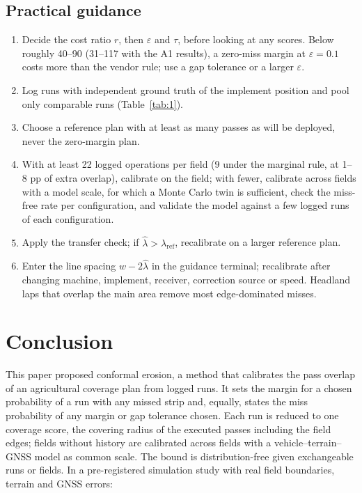 \documentclass[preprint,12pt,authoryear]{elsarticle}
\providecommand{\tightlist}{\setlength{\itemsep}{0pt}\setlength{\parskip}{0pt}}
\begin{document}
\subsection{Practical guidance}

\begin{enumerate}
\def\labelenumi{\arabic{enumi}.}
\tightlist
\item
  Decide the cost ratio \(r\), then \(\varepsilon\) and \(\tau\), before looking at any scores. Below roughly 40--90 (31--117 with the A1 results), a zero-miss margin at \(\varepsilon=0.1\) costs more than the vendor rule; use a gap tolerance or a larger \(\varepsilon\).
\item
  Log runs with independent ground truth of the implement position and pool only comparable runs (Table~\ref{tab:1}).
\item
  Choose a reference plan with at least as many passes as will be deployed, never the zero-margin plan.
\item
  With at least 22 logged operations per field (9 under the marginal rule, at 1--8 pp of extra overlap), calibrate on the field; with fewer, calibrate across fields with a model scale, for which a Monte Carlo twin is sufficient, check the miss-free rate per configuration, and validate the model against a few logged runs of each configuration.
\item
  Apply the transfer check; if \(\hat\lambda>\lambda_\mathrm{ref}\), recalibrate on a larger reference plan.
\item
  Enter the line spacing \(w-2\hat\lambda\) in the guidance terminal; recalibrate after changing machine, implement, receiver, correction source or speed. Headland laps that overlap the main area remove most edge-dominated misses.
\end{enumerate}

\section{Conclusion}

This paper proposed conformal erosion, a method that calibrates the pass overlap of an agricultural coverage plan from logged runs. It sets the margin for a chosen probability of a run with any missed strip and, equally, states the miss probability of any margin or gap tolerance chosen. Each run is reduced to one coverage score, the covering radius of the executed passes including the field edges; fields without history are calibrated across fields with a vehicle--terrain--GNSS model as common scale. The bound is distribution-free given exchangeable runs or fields. In a pre-registered simulation study with real field boundaries, terrain and GNSS errors:
\end{document}
